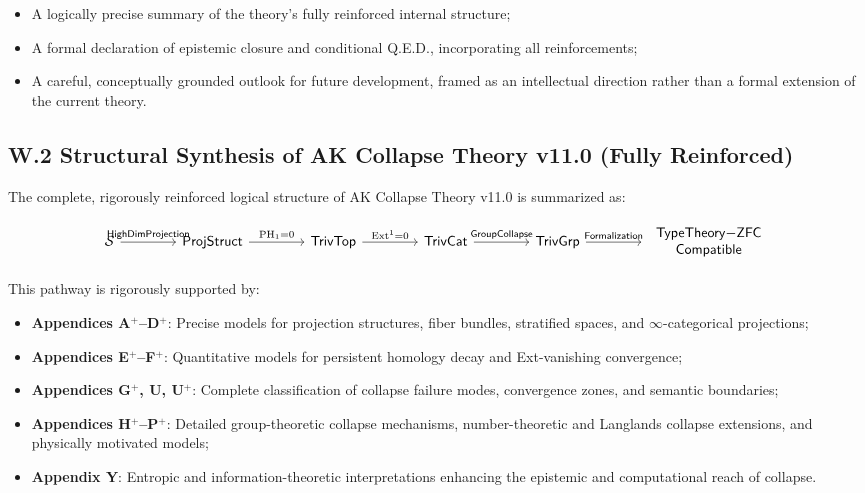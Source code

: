 \documentclass[11pt]{article}
\begin{document}
\begin{itemize}
    \item A logically precise summary of the theory's fully reinforced internal structure;
    \item A formal declaration of epistemic closure and conditional Q.E.D., incorporating all reinforcements;
    \item A careful, conceptually grounded outlook for future development, framed as an intellectual direction rather than a formal extension of the current theory.
\end{itemize}

\subsection*{W.2 Structural Synthesis of AK Collapse Theory v11.0 (Fully Reinforced)}

The complete, rigorously reinforced logical structure of AK Collapse Theory v11.0 is summarized as:

\[
\begin{tikzcd}[column sep=4em, row sep=3em]
\mathcal{S} \arrow[r, "\mathsf{HighDimProjection}"]
& \mathsf{ProjStruct} \arrow[r, "\mathrm{PH}_1 = 0"]
& \mathsf{TrivTop} \arrow[r, "\mathrm{Ext}^1 = 0"]
& \mathsf{TrivCat} \arrow[r, "\mathsf{GroupCollapse}"]
& \mathsf{TrivGrp} \arrow[r, "\mathsf{Formalization}"]
& {\begin{tabular}{c}
\(\mathsf{TypeTheory{-}ZFC}\) \\
\(\mathsf{Compatible}\)
\end{tabular}}
\end{tikzcd}
\]

This pathway is rigorously supported by:

\begin{itemize}
    \item \textbf{Appendices A$^{+}$–D$^{+}$}: Precise models for projection structures, fiber bundles, stratified spaces, and $\infty$-categorical projections;
    \item \textbf{Appendices E$^{+}$–F$^{+}$}: Quantitative models for persistent homology decay and Ext-vanishing convergence;
    \item \textbf{Appendices G$^{+}$, U, U$^{+}$}: Complete classification of collapse failure modes, convergence zones, and semantic boundaries;
    \item \textbf{Appendices H$^{+}$–P$^{+}$}: Detailed group-theoretic collapse mechanisms, number-theoretic and Langlands collapse extensions, and physically motivated models;
    \item \textbf{Appendix Y}: Entropic and information-theoretic interpretations enhancing the epistemic and computational reach of collapse.
\end{itemize}
\end{document}
